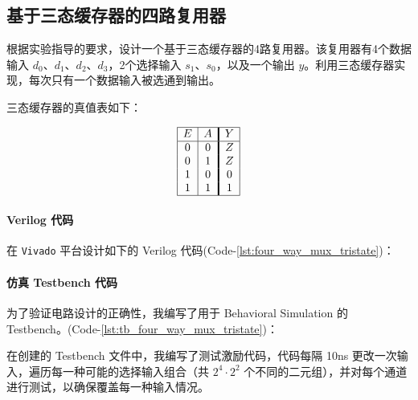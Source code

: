 \documentclass[10pt,a4paper,twoside]{rho-class/rho}
\begin{document}
    
    \subsection{基于三态缓存器的四路复用器}
        
        根据实验指导的要求，设计一个基于三态缓存器的4路复用器。该复用器有4个数据输入 $d_0$、$d_1$、$d_2$、$d_3$，2个选择输入 $s_1$、$s_0$，以及一个输出 $y$。利用三态缓存器实现，每次只有一个数据输入被选通到输出。
        
        三态缓存器的真值表如下：

            \[
            \begin{array}{|c|c!{\vrule width 1.4pt}c|}
            \hline
            E & A & Y \\
            \hline
            0 & 0 & Z \\
            0 & 1 & Z \\
            1 & 0 & 0 \\
            1 & 1 & 1 \\
            \hline
            \end{array}
            \]

        \paragraph{Verilog 代码}
        
        在 \verb|Vivado| 平台设计如下的 Verilog 代码(Code-\ref{lst:four_way_mux_tristate})：
                

        
        \paragraph{仿真 Testbench 代码}
        
            为了验证电路设计的正确性，我编写了用于 Behavioral Simulation 的 Testbench。(Code-\ref{lst:tb_four_way_mux_tristate})：
                


                
            在创建的 Testbench 文件中，我编写了测试激励代码，代码每隔 10ns 更改一次输入，遍历每一种可能的选择输入组合（共 $2^4 \cdot 2^2$ 个不同的二元组），并对每个通道进行测试，以确保覆盖每一种输入情况。
        
\end{document}

